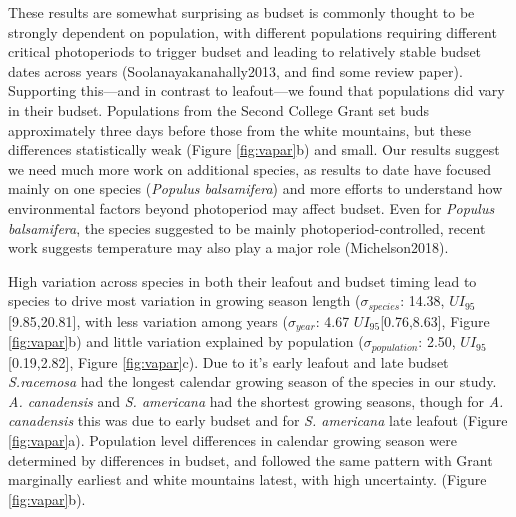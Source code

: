 \documentclass{article}[12pt]
\begin{document}
These results are somewhat surprising as budset is commonly thought to be strongly dependent on population, with different populations requiring different critical photoperiods to trigger budset and leading to relatively stable budset dates across years (Soolanayakanahally2013, and find some review paper). Supporting this---and in contrast to leafout---we found that populations did vary in their budset. Populations from the Second College Grant set buds approximately three days before those from the white mountains, but these differences statistically weak (Figure \ref{fig:vapar}b) and small. Our results suggest we need much more work on additional species, as results to date have focused mainly on one species (\emph{Populus balsamifera}) and more efforts to understand how environmental factors beyond photoperiod may affect budset. Even for \emph{Populus balsamifera}, the species suggested to be mainly photoperiod-controlled, recent work suggests temperature may also play a major role (Michelson2018).   


High variation across species in both their leafout and budset timing lead to species to drive most variation in  growing season length  ($\sigma_{species}$: 14.38, $UI_{95}$[9.85,20.81], with less variation among years ($\sigma_{year}$: 4.67 $UI_{95}$[0.76,8.63], Figure \ref{fig:vapar}b) and little variation explained by population ($\sigma_{population}$: 2.50, $UI_{95}$[0.19,2.82], Figure \ref{fig:vapar}c). Due to it's early leafout and late budset \emph{S.racemosa} had the longest calendar growing season of the species in our study. \emph{A. canadensis} and \emph{S. americana} had the shortest growing seasons, though for \emph{A. canadensis} this was due to early budset and for \emph{S. americana} late leafout (Figure \ref{fig:vapar}a). Population level differences in calendar growing season were determined by differences in budset, and followed the same pattern with Grant marginally earliest and white mountains  latest, with high uncertainty. (Figure \ref{fig:vapar}b). 
\end{document}
